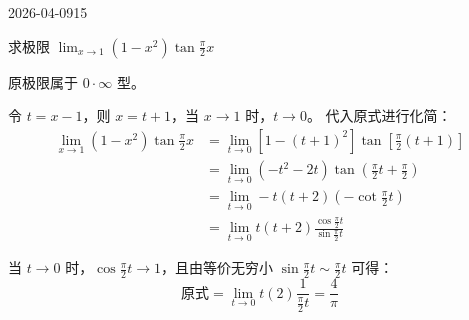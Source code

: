 \begin{mistake}{2026-04-09}{15}

\begin{problemcontent}
求极限 \(\displaystyle \lim_{x \to 1} (1 - x^2)\tan \frac{\pi}{2}x\)
\end{problemcontent}

\begin{solutioncontent}
原极限属于 \(0 \cdot \infty\) 型。

令 \(t = x - 1\)，则 \(x = t + 1\)，当 \(x \to 1\) 时，\(t \to 0\)。
代入原式进行化简：
\[
\begin{aligned}
\lim_{x \to 1} (1 - x^2)\tan \frac{\pi}{2}x 
&= \lim_{t \to 0} [1 - (t + 1)^2] \tan \left[ \frac{\pi}{2}(t + 1) \right] \\
&= \lim_{t \to 0} (-t^2 - 2t) \tan \left( \frac{\pi}{2}t + \frac{\pi}{2} \right) \\
&= \lim_{t \to 0} -t(t + 2) \left( -\cot \frac{\pi}{2}t \right) \\
&= \lim_{t \to 0} t(t + 2) \frac{\cos \frac{\pi}{2}t}{\sin \frac{\pi}{2}t}
\end{aligned}
\]

当 \(t \to 0\) 时，\(\cos \frac{\pi}{2}t \to 1\)，且由等价无穷小 \(\sin \frac{\pi}{2}t \sim \frac{\pi}{2}t\) 可得：
\[
\text{原式} = \lim_{t \to 0} t(2) \frac{1}{\frac{\pi}{2}t} = \frac{4}{\pi}
\]
\end{solutioncontent}


\end{mistake}
